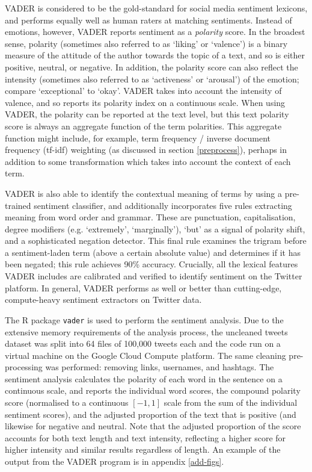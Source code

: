 \documentclass{article}
\begin{document}
VADER is considered to be the gold-standard for social media sentiment lexicons, and performs equally well as human raters at matching sentiments. Instead of emotions, however, VADER reports sentiment as a \textit{polarity} score. In the broadest sense, polarity (sometimes also referred to as `liking' or `valence') is a binary measure of the attitude of the author towards the topic of a text, and so is either positive, neutral, or negative. In addition, the polarity score can also reflect the intensity (sometimes also referred to as `activeness' or `arousal') of the emotion; compare `exceptional' to `okay'. VADER takes into account the intensity of valence, and so reports its polarity index on a continuous scale. When using VADER, the polarity can be reported at the text level, but this text polarity score is always an aggregate function of the term polarities. This aggregate function might include, for example, term frequency / inverse document frequency (tf-idf) weighting (as discussed in section \ref{preprocess}), perhaps in addition to some transformation which takes into account the context of each term.

VADER is also able to identify the contextual meaning of terms by using a pre-trained sentiment classifier, and additionally incorporates five rules extracting meaning from word order and grammar. These are punctuation, capitalisation, degree modifiers (e.g. `extremely', `marginally'), `but' as a signal of polarity shift, and a sophisticated negation detector. This final rule examines the trigram before a sentiment-laden term (above a certain absolute value) and determines if it has been negated; this rule achieves 90\% accuracy. Crucially, all the lexical features VADER includes are calibrated and verified to identify sentiment on the Twitter platform. In general, VADER performs as well or better than cutting-edge, compute-heavy sentiment extractors on Twitter data. 

The R package \texttt{vader} \parencite{roehrickVaderValenceAware2020} is used to perform the sentiment analysis. Due to the extensive memory requirements of the analysis process, the uncleaned tweets dataset was split into 64 files of 100,000 tweets each and the code run on a virtual machine on the Google Cloud Compute platform. The same cleaning pre-processing was performed: removing links, usernames, and hashtags. The sentiment analysis calculates the polarity of each word in the sentence on a continuous scale, and reports the  individual word scores, the compound polarity score (normalised to a continuous \([-1,1]\) scale from the sum of the individual sentiment scores), and the adjusted proportion of the text that is positive (and likewise for negative and neutral. Note that the adjusted proportion of the score accounts for both text length and text intensity, reflecting a higher score for higher intensity and similar results regardless of length. An example of the output from the VADER program is in appendix \ref{add-figs}.
\end{document}
